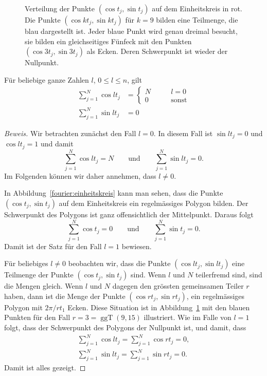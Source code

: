 \begin{figure}
\begin{tikzpicture}[>=latex,thick]
\end{tikzpicture}
\caption{Verteilung der Punkte $(\cos t_j, \sin t_j)$  auf dem Einheitskreis 
in rot.
Die Punkte $(\cos kt_j,\sin kt_j)$ für $k=9$ bilden eine Teilmenge, die
blau dargestellt ist.
Jeder blaue Punkt wird genau dreimal besucht, sie bilden ein gleichseitiges
Fünfeck mit den Punkten $(\cos 3t_j,\sin 3t_j)$ als Ecken.
Deren Schwerpunkt ist wieder der Nullpunkt.
\label{fourier:einheitskreis}
}
\end{figure}

\begin{satz}
\label{skript:fourier:orthogonalitaet1}
Für beliebige ganze Zahlen $l$, $0\le l\le n$, gilt
\begin{equation*}
\begin{aligned}
\sum_{j=1}^N \cos lt_j
&=
\begin{cases}
N&\qquad l=0\\
0&\qquad\text{sonst}
\end{cases}
\\
\sum_{j=1}^N \sin lt_j
&=0
\end{aligned}
\end{equation*}
\end{satz}

\begin{proof}[Beweis]
Wir betrachten zunächst den Fall $l=0$.
In diesem Fall ist $\sin lt_j=0$ und $\cos lt_j=1$ und damit
\[
\sum_{j=1}^N \cos lt_j = N
\qquad\text{und}\qquad
\sum_{j=1}^N \sin lt_j = 0.
\]
Im Folgenden können wir daher annehmen, dass $l\ne 0$.

In Abbildung~\eqref{fourier:einheitskreis} kann man sehen, dass die Punkte
$(\cos t_j,\sin t_j)$ auf dem Einheitskreis ein regelmässiges Polygon
bilden.
Der Schwerpunkt des Polygons ist ganz offensichtlich der Mittelpunkt.
Daraus folgt
\[
\sum_{j=1}^N \cos t_j = 0
\qquad\text{und}\qquad
\sum_{j=1}^N \sin t_j = 0.
\]
Damit ist der Satz für den Fall $l=1$ bewiesen.

Für beliebiges $l\ne 0$ beobachten wir, dass die Punkte 
$(\cos lt_j,\sin lt_j)$ eine Teilmenge der Punkte $(\cos t_j, \sin t_j)$
sind.
Wenn $l$ und $N$ teilerfremd sind, sind die Mengen gleich.
Wenn $l$ und $N$ dagegen den grössten gemeinsamen Teiler $r$ haben, dann
ist die Menge der Punkte $(\cos rt_j,\sin rt_j)$, ein regelmässiges
Polygon mit $2\pi / rt_1$ Ecken.
Diese Situation ist in Abbildung~\ref{fourier:einheitskreis} mit den
blauen Punkten für den Fall $r=3=\operatorname{ggT}(9,15)$
illustriert.
Wie im Falle von $l=1$ folgt, dass der Schwerpunkt des Polygons der
Nullpunkt ist, und damit, dass
\begin{align*}
\sum_{j=1}^N \cos lt_j 
=
\sum_{j=1}^N \cos rt_j 
=
0,
\\
\sum_{j=1}^N \sin lt_j 
=
\sum_{j=1}^N \sin rt_j 
=
0.
\end{align*}
Damit ist alles gezeigt.
\end{proof}

